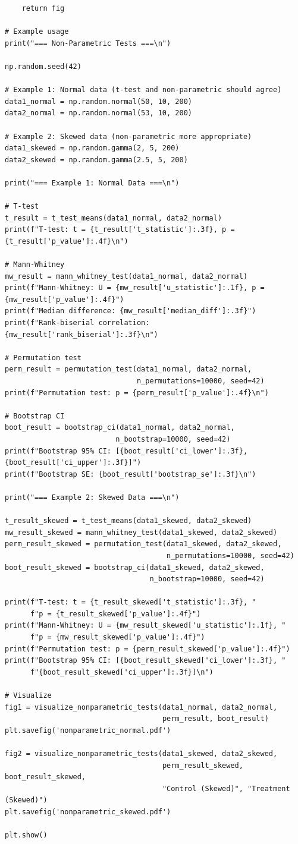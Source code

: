 \begin{lstlisting}
    return fig

# Example usage
print("=== Non-Parametric Tests ===\n")

np.random.seed(42)

# Example 1: Normal data (t-test and non-parametric should agree)
data1_normal = np.random.normal(50, 10, 200)
data2_normal = np.random.normal(53, 10, 200)

# Example 2: Skewed data (non-parametric more appropriate)
data1_skewed = np.random.gamma(2, 5, 200)
data2_skewed = np.random.gamma(2.5, 5, 200)

print("=== Example 1: Normal Data ===\n")

# T-test
t_result = t_test_means(data1_normal, data2_normal)
print(f"T-test: t = {t_result['t_statistic']:.3f}, p = {t_result['p_value']:.4f}\n")

# Mann-Whitney
mw_result = mann_whitney_test(data1_normal, data2_normal)
print(f"Mann-Whitney: U = {mw_result['u_statistic']:.1f}, p = {mw_result['p_value']:.4f}")
print(f"Median difference: {mw_result['median_diff']:.3f}")
print(f"Rank-biserial correlation: {mw_result['rank_biserial']:.3f}\n")

# Permutation test
perm_result = permutation_test(data1_normal, data2_normal,
                               n_permutations=10000, seed=42)
print(f"Permutation test: p = {perm_result['p_value']:.4f}\n")

# Bootstrap CI
boot_result = bootstrap_ci(data1_normal, data2_normal,
                          n_bootstrap=10000, seed=42)
print(f"Bootstrap 95% CI: [{boot_result['ci_lower']:.3f}, {boot_result['ci_upper']:.3f}]")
print(f"Bootstrap SE: {boot_result['bootstrap_se']:.3f}\n")

print("=== Example 2: Skewed Data ===\n")

t_result_skewed = t_test_means(data1_skewed, data2_skewed)
mw_result_skewed = mann_whitney_test(data1_skewed, data2_skewed)
perm_result_skewed = permutation_test(data1_skewed, data2_skewed,
                                      n_permutations=10000, seed=42)
boot_result_skewed = bootstrap_ci(data1_skewed, data2_skewed,
                                  n_bootstrap=10000, seed=42)

print(f"T-test: t = {t_result_skewed['t_statistic']:.3f}, "
      f"p = {t_result_skewed['p_value']:.4f}")
print(f"Mann-Whitney: U = {mw_result_skewed['u_statistic']:.1f}, "
      f"p = {mw_result_skewed['p_value']:.4f}")
print(f"Permutation test: p = {perm_result_skewed['p_value']:.4f}")
print(f"Bootstrap 95% CI: [{boot_result_skewed['ci_lower']:.3f}, "
      f"{boot_result_skewed['ci_upper']:.3f}]\n")

# Visualize
fig1 = visualize_nonparametric_tests(data1_normal, data2_normal,
                                     perm_result, boot_result)
plt.savefig('nonparametric_normal.pdf')

fig2 = visualize_nonparametric_tests(data1_skewed, data2_skewed,
                                     perm_result_skewed, boot_result_skewed,
                                     "Control (Skewed)", "Treatment (Skewed)")
plt.savefig('nonparametric_skewed.pdf')

plt.show()
\end{lstlisting}

